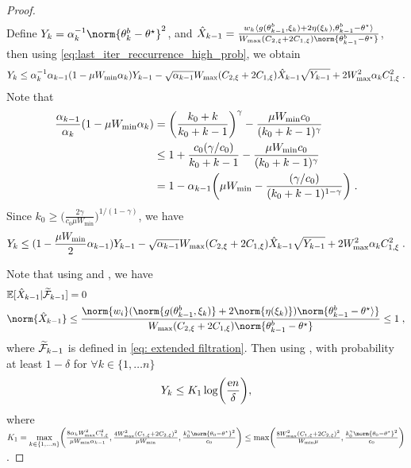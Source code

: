 \begin{proof}
\begin{equation}
\begin{split}
    \end{split}
\end{equation}
Define $Y_k = \alpha_k^{-1}\norm{\theta_k^b-\thetas}^2$, and $\hat X_{k-1}  = \frac{w_k\langle g(\theta_{k-1}^b, \xi_k)+2\eta(\xi_k), \theta_{k-1}^b-\thetas \rangle}{W_{\max}(C_{2,\xi} + 2C_{1,\xi})\norm{\theta_{k-1}^b-\thetas}} $, then using \eqref{eq:last_iter_reccurrence_high_prob}, we obtain 
\begin{equation}
    Y_k \leq\alpha_k^{-1} \alpha_{k-1}(1-\mu W_{\min}\alpha_k)Y_{k-1} - \sqrt{\alpha_{k-1}}W_{\max}(C_{2,\xi} + 2C_{1,\xi})\hat X_{k-1}\sqrt{Y_{k-1}}+ 2W_{\max}^2\alpha_kC_{1,\xi}^2\;.
\end{equation}
Note that 
\begin{align}
\label{eq:bound_contracting_multiplier_last_iter}
     \frac{\alpha_{k-1}}{\alpha_k}(1-\mu W_{\min}\alpha_k) &= \biggl(\frac{k_0+k}{k_0+k-1}\biggr)^{\gamma} -\frac{\mu W_{\min}c_0}{(k_0+k-1)^{\gamma}}\\&\leq 1 + \frac{c_0(\gamma/c_0)}{k_0+k-1}-\frac{\mu W_{\min}c_0}{(k_0+k-1)^{\gamma}}\\& = 1 - \alpha_{k-1}\biggr( \mu W_{\min} -\frac{(\gamma/c_0)}{(k_0+k-1)^{1-\gamma}}\biggl)\;.
\end{align}
 Since $k_0\geq \biggl(\frac{2\gamma}{c_0\mu W_{\min}}\biggr)^{1/(1-\gamma)}$, we have 
\begin{equation}
    Y_k \leq(1-\frac{\mu W_{\min}}{2}\alpha_{k-1})Y_{k-1} - \sqrt{\alpha_{k-1}}W_{\max}(C_{2,\xi} + 2C_{1,\xi})\hat X_{k-1}\sqrt{Y_{k-1}}+ 2W_{\max}^2\alpha_kC_{1,\xi}^2\;.
\end{equation}

Note that using  and , we have
\begin{equation}
\begin{split}
    &\PE[\hat X_{k-1}|\widetilde{\F}_{k-1}] = 0\\
    &\norm{\hat X_{k-1}} \leq \frac{\norm{w_i}(\norm{g(\theta_{k-1}^b, \xi_k)}+2\norm{\eta(\xi_k)})\norm{\theta_{k-1}^b-\thetas \rangle}}{W_{\max}(C_{2,\xi} + 2C_{1,\xi})\norm{\theta_{k-1}^b-\thetas}} \leq 1 \eqsp,
\end{split}
\end{equation}
where $\widetilde{\mathcal{F}}_{k-1}$ is defined in \eqref{eq: extended filtration}. Then using \cite[Theorem 4.1]{harvey2019tight}, with probability at least $1-\delta$ for $\forall k\in\{1,\ldots n\}$
\begin{equation}
     Y_k \leq K_1 \log\biggl(\frac{\mathrm{e} n}{\delta}\biggr), 
\end{equation}
where $K_1 = \underset{k\in\{1,\ldots n\}}{\max}\biggl(\frac{8\alpha_kW_{\max}^2 C_{1,\xi}^2}{\mu W_{\min}\alpha_{k-1}}, \frac{4W_{\max}^2(C_{1,\xi}+2C_{2,\xi})^2}{\mu W_{\min}}, \frac{k_0^\gamma\norm{\theta_0-\thetas}^2}{c_0}\biggr) \leq  \max\biggl(\frac{8W_{\max}^2(C_{1,\xi}+2C_{2,\xi})^2}{W_{\min}\mu},\frac{k_0^\gamma\norm{\theta_0-\thetas}^2}{c_0} \biggr)$.
\end{proof}


